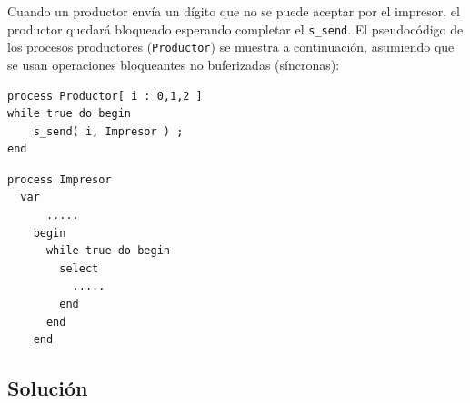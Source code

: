 \documentclass[a4paper,12pt]{article}
\begin{document}
Cuando un productor envía un dígito que no se puede aceptar por el impresor, el productor quedará bloqueado esperando completar el \texttt{s\_send}. El pseudocódigo de los procesos productores (\texttt{Productor}) se muestra a continuación, asumiendo que se usan operaciones bloqueantes no buferizadas (síncronas):

\begin{lstlisting}[style=customcpp]
process Productor[ i : 0,1,2 ]
while true do begin
    s_send( i, Impresor ) ;
end
\end{lstlisting}

\begin{lstlisting}[style=customcpp, caption={Pseudocódigo del proceso Impresor}]
process Impresor
  var
      .....
    begin
      while true do begin
        select
          .....
        end
      end
    end
\end{lstlisting}


\subsection{Solución}
\end{document}

